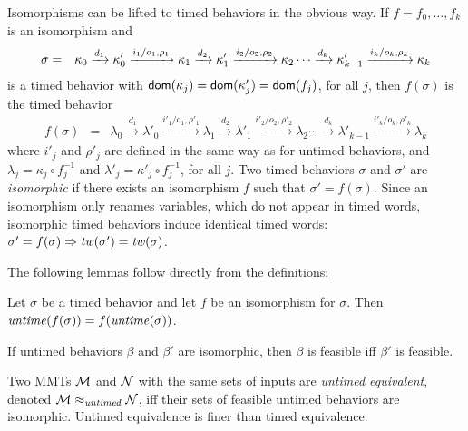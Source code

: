 Isomorphisms can be lifted to timed behaviors in the obvious way. If $f = f_0 ,\ldots, f_k$ is an isomorphism and
\begin{eqnarray*}
\sigma & = & \kappa_0 \xrightarrow{d_1} \kappa'_0 \xrightarrow{i_1/o_1, \rho_1} \kappa_1 \xrightarrow{d_2} \kappa'_1 \xrightarrow{i_2/o_2, \rho_2} \kappa_2 \cdots
\xrightarrow{d_k} \kappa'_{k-1} \xrightarrow{i_k/o_k, \rho_k} \kappa_{k}
\end{eqnarray*}
is a timed behavior with ${\textsf{dom}}(\kappa_j) = {\textsf{dom}}(\kappa'_j) = {\textsf{dom}}(f_j)$, for all $j$, then $f(\sigma)$ is
the timed behavior
\begin{eqnarray*}
f(\sigma) & = & \lambda_0 \xrightarrow{d_1} \lambda'_0 \xrightarrow{i'_1/o_1, \rho'_1} \lambda_1 \xrightarrow{d_2} \lambda'_1 \xrightarrow{i'_2/o_2, \rho'_2} \lambda_2 \cdots
\xrightarrow{d_k} \lambda'_{k-1} \xrightarrow{i'_k/o_k, \rho'_k} \lambda_{k}
\end{eqnarray*}
where $i'_j$ and $\rho'_j$ are defined in the same way as for untimed behaviors, and
$\lambda_j = \kappa_j \circ f_j^{-1}$ and $\lambda'_j = \kappa'_j \circ f_j^{-1}$, for all $j$.
Two timed behaviors $\sigma$ and $\sigma'$ are \emph{isomorphic} if there exists an isomorphism $f$ such that
$\sigma' = f(\sigma)$.
Since an isomorphism only renames variables, which do not appear in timed words, 
isomorphic timed behaviors induce identical timed words: $\sigma' = f(\sigma) \Rightarrow \mathit{tw}(\sigma') = \mathit{tw}(\sigma)$.

The following lemmas follow directly from the definitions:
\begin{lemma}
\label{lemma isomorphism}
Let $\sigma$ be a timed behavior and let $f$ be an isomorphism for $\sigma$.
Then $\mathit{untime}(f(\sigma)) = f(\mathit{untime}(\sigma))$.
\end{lemma}
\begin{lemma}
If untimed behaviors $\beta$ and $\beta'$ are isomorphic, then $\beta$ is feasible iff $\beta'$ is feasible.
\end{lemma}

\fi
Two MMTs ${\cal M}$ and ${\cal N}$ with the same sets of inputs are \emph{untimed equivalent}, denoted ${\cal M} \approx_{\mathit{untimed}} {\cal N}$, iff their sets of feasible untimed behaviors are isomorphic.
\iflong
Untimed equivalence is finer than timed equivalence.
\fi

